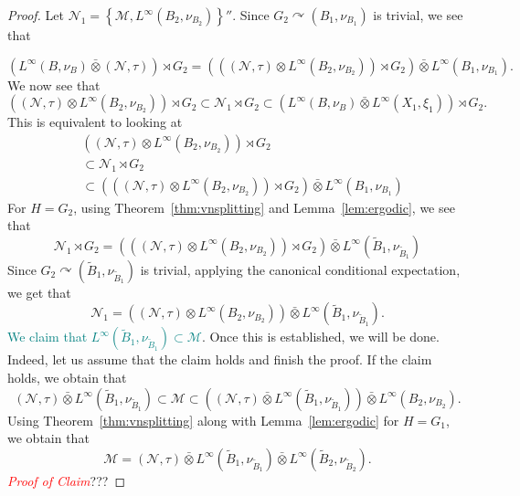 \documentclass[10pt,a4paper]{amsart}
\begin{document}
\begin{proof}
Let $\mathcal{N}_1=\left\{\mathcal{M},L^{\infty}(B_2,\nu_{B_2})\right\}''$. 
Since $G_2\curvearrowright (B_1,\nu_{B_1})$ is trivial, we see that

\[\left(L^{\infty}(B,\nu_{B})\bar{\otimes}(\mathcal{N},\tau)\right)\rtimes G_2=\left(\left((\mathcal{N},\tau)\otimes L^{\infty}(B_2,\nu_{B_2})\right)\rtimes G_2\right)\bar{\otimes} L^{\infty}(B_1,\nu_{B_1}).\]
We now see that 
\[\left((\mathcal{N},\tau)\otimes L^{\infty}(B_2,\nu_{B_2})\right)\rtimes G_2\subset\mathcal{N}_1\rtimes G_2\subset\left(L^{\infty}(B,\nu_B)\bar{\otimes}L^{\infty}(X_1,\xi_1)\right)\rtimes G_2.\]
This is equivalent to looking at
\begin{align*}&\left((\mathcal{N},\tau)\otimes L^{\infty}(B_2,\nu_{B_2})\right)\rtimes G_2\\&\subset\mathcal{N}_1\rtimes G_2\\&\subset\left(\left((\mathcal{N},\tau)\otimes L^{\infty}(B_2,\nu_{B_2})\right)\rtimes G_2\right)\bar{\otimes} L^{\infty}(B_1,\nu_{B_1})\end{align*}
For $H=G_2$, using Theorem~\ref{thm:vnsplitting} and Lemma~\ref{lem:ergodic}, we see that
\[\mathcal{N}_1\rtimes G_2=\left(\left((\mathcal{N},\tau)\otimes L^{\infty}(B_2,\nu_{B_2})\right)\rtimes G_2\right)\bar{\otimes} L^{\infty}(\tilde{B}_1,\nu_{\tilde{B}_1})\]
Since $G_2\curvearrowright(\tilde{B}_1,\nu_{\tilde{B}_1})$ is trivial, applying the canonical conditional expectation, we get that
\[\mathcal{N}_1=\left((\mathcal{N},\tau)\otimes L^{\infty}(B_2,\nu_{B_2})\right)\bar{\otimes}L^{\infty}(\tilde{B}_1,\nu_{\tilde{B}_1}).\]
\textcolor{teal}{We claim that $L^{\infty}(\tilde{B}_1,\nu_{\tilde{B}_1})\subset \mathcal{M}$}. Once this is established, we will be done. Indeed, let us assume that the claim holds and finish the proof. If the claim holds, we obtain that
\[(\mathcal{N},\tau)\bar{\otimes} L^{\infty}(\tilde{B}_1,\nu_{\tilde{B}_1})\subset\mathcal{M}\subset\left((\mathcal{N},\tau)\bar{\otimes} L^{\infty}(\tilde{B}_1,\nu_{\tilde{B}_1})\right)\bar{\otimes} L^{\infty}(B_2,\nu_{B_2}).\]
Using Theorem~\ref{thm:vnsplitting} along with Lemma~\ref{lem:ergodic} for $H=G_1$, we obtain that
\[\mathcal{M}=(\mathcal{N},\tau)\bar{\otimes} L^{\infty}(\tilde{B}_1,\nu_{\tilde{B}_1})\bar{\otimes} L^{\infty}(\tilde{B}_2,\nu_{\tilde{B}_2}).\]
\textcolor{red}{\textit{Proof of Claim}}???
\end{proof}
\end{document}
